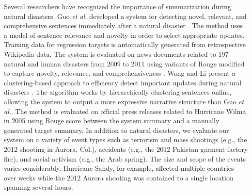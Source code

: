 Several researchers have recognized the importance of summarization during
natural disasters.  Guo \textit{et al.} developed a system for detecting
novel, relevant, and comprehensive sentences immediately after a natural
disaster \cite{qi:temporal-summarization}.  The method uses a model of
sentence relevance and novelty in order to select appropriate updates.
Training data for regression targets is automatically generated from
retrospective Wikipedia data.  The system is evaluated on news documents
related to 197 natural and human disasters from 2009 to 2011 using variants of
Rouge modified to capture novelty, relevance, and comprehensiveness
\cite{lin2004rouge}.  Wang and Li present a clustering-based approach to
efficiency detect important updates during natural disasters
\cite{wang:update-summarization}.  The algorithm works by hierarchically
clustering sentences online, allowing the system to output a more expressive
narrative structure than Guo \textit{et al.}.  The method is evaluated on
official press releases related to Hurricane Wilma  in 2005 using Rouge score
between the system summary and a manually generated target summary. In addition
to natural disasters, we evaluate our system on a variety of event types 
 such as terrorism and mass shootings (e.g., the 2012
shooting in Aurora, Col.), accidents
(e.g., the 2012 Pakistan garment factory fire), and social activism (e.g., the
Arab spring). The size and scope of the events varies considerably. Hurricane
Sandy, for example, affected multiple countries over weeks while the
2012 Aurora shooting was contained to a single location spanning several hours.



